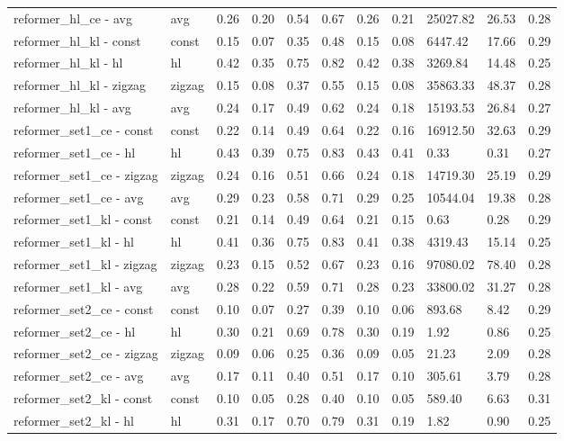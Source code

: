 \begin{longtable}{|p{1.3cm}|p{1.3cm}|p{1.3cm}|p{1.3cm}|p{1.3cm}|p{1.3cm}|p{1.3cm}|p{1.3cm}|p{1.3cm}|p{1.3cm}|p{1.3cm}|}
reformer_hl_ce - avg & avg & 0.26 & 0.20 & 0.54 & 0.67 & 0.26 & 0.21 & 25027.82 & 26.53 & 0.28 \\
reformer_hl_kl - const & const & 0.15 & 0.07 & 0.35 & 0.48 & 0.15 & 0.08 & 6447.42 & 17.66 & 0.29 \\
reformer_hl_kl - hl & hl & 0.42 & 0.35 & 0.75 & 0.82 & 0.42 & 0.38 & 3269.84 & 14.48 & 0.25 \\
reformer_hl_kl - zigzag & zigzag & 0.15 & 0.08 & 0.37 & 0.55 & 0.15 & 0.08 & 35863.33 & 48.37 & 0.28 \\
reformer_hl_kl - avg & avg & 0.24 & 0.17 & 0.49 & 0.62 & 0.24 & 0.18 & 15193.53 & 26.84 & 0.27 \\
reformer_set1_ce - const & const & 0.22 & 0.14 & 0.49 & 0.64 & 0.22 & 0.16 & 16912.50 & 32.63 & 0.29 \\
reformer_set1_ce - hl & hl & 0.43 & 0.39 & 0.75 & 0.83 & 0.43 & 0.41 & 0.33 & 0.31 & 0.27 \\
reformer_set1_ce - zigzag & zigzag & 0.24 & 0.16 & 0.51 & 0.66 & 0.24 & 0.18 & 14719.30 & 25.19 & 0.29 \\
reformer_set1_ce - avg & avg & 0.29 & 0.23 & 0.58 & 0.71 & 0.29 & 0.25 & 10544.04 & 19.38 & 0.28 \\
reformer_set1_kl - const & const & 0.21 & 0.14 & 0.49 & 0.64 & 0.21 & 0.15 & 0.63 & 0.28 & 0.29 \\
reformer_set1_kl - hl & hl & 0.41 & 0.36 & 0.75 & 0.83 & 0.41 & 0.38 & 4319.43 & 15.14 & 0.25 \\
reformer_set1_kl - zigzag & zigzag & 0.23 & 0.15 & 0.52 & 0.67 & 0.23 & 0.16 & 97080.02 & 78.40 & 0.28 \\
reformer_set1_kl - avg & avg & 0.28 & 0.22 & 0.59 & 0.71 & 0.28 & 0.23 & 33800.02 & 31.27 & 0.28 \\
reformer_set2_ce - const & const & 0.10 & 0.07 & 0.27 & 0.39 & 0.10 & 0.06 & 893.68 & 8.42 & 0.29 \\
reformer_set2_ce - hl & hl & 0.30 & 0.21 & 0.69 & 0.78 & 0.30 & 0.19 & 1.92 & 0.86 & 0.25 \\
reformer_set2_ce - zigzag & zigzag & 0.09 & 0.06 & 0.25 & 0.36 & 0.09 & 0.05 & 21.23 & 2.09 & 0.28 \\
reformer_set2_ce - avg & avg & 0.17 & 0.11 & 0.40 & 0.51 & 0.17 & 0.10 & 305.61 & 3.79 & 0.28 \\
reformer_set2_kl - const & const & 0.10 & 0.05 & 0.28 & 0.40 & 0.10 & 0.05 & 589.40 & 6.63 & 0.31 \\
reformer_set2_kl - hl & hl & 0.31 & 0.17 & 0.70 & 0.79 & 0.31 & 0.19 & 1.82 & 0.90 & 0.25 \\

\end{longtable}
